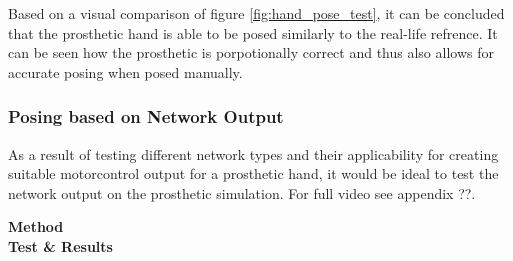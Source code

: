 \documentclass[../main.tex]{subfiles}
\begin{document}
Based on a visual comparison of figure \ref{fig:hand_pose_test}, it can be concluded that the prosthetic hand is able to be posed similarly to the real-life refrence.
It can be seen how the prosthetic is porpotionally correct and thus also allows for accurate posing when posed manually.

\subsubsection{Posing based on Network Output}

As a result of testing different network types and their applicability for creating suitable motorcontrol output for a prosthetic hand, it would be ideal to test the network output on the prosthetic simulation.
For full video see appendix ??.

\textbf{Method}\\

\textbf{Test \& Results}\\





\end{document}
